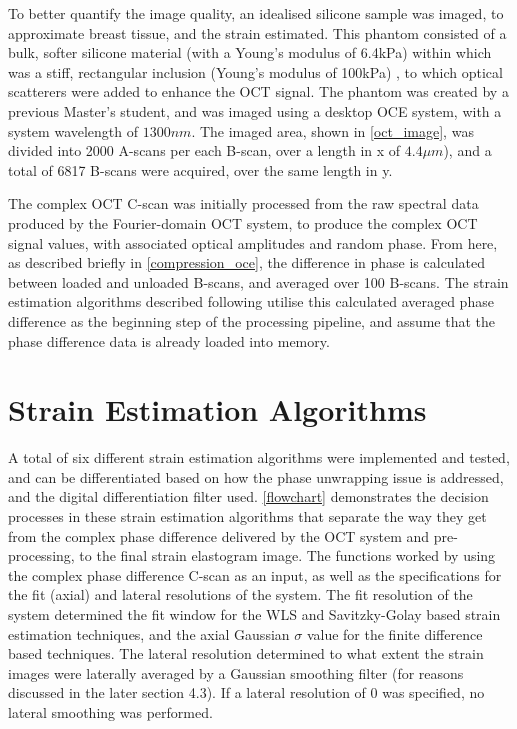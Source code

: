 To better quantify the image quality, an idealised silicone sample was imaged, to approximate breast tissue, and the strain estimated. This phantom consisted of a bulk, softer silicone material (with a Young's modulus of 6.4kPa) within which was a stiff, rectangular inclusion (Young's modulus of 100kPa) \cite{hepburn_improving_2017}, to which optical scatterers were added to enhance the OCT signal. The phantom was created by a previous Master's student, and was imaged using a desktop OCE system, with a system wavelength of $1300nm$. The imaged area, shown in \autoref{oct_image}, was divided into 2000 A-scans per each B-scan, over a length in x of $4.4\mu m$), and a total of 6817 B-scans were acquired, over the same length in y.

The complex OCT C-scan was initially processed from the raw spectral data produced by the Fourier-domain OCT system, to produce the complex OCT signal values, with associated optical amplitudes and random phase. From here, as described briefly in \autoref{compression_oce}, the difference in phase is calculated between loaded and unloaded B-scans, and averaged over 100 B-scans. The strain estimation algorithms described following utilise this calculated averaged phase difference as the beginning step of the processing pipeline, and assume that the phase difference data is already loaded into memory.

\section{Strain Estimation Algorithms}\label{algorithms}

A total of six different strain estimation algorithms were implemented and tested, and can be differentiated based on how the phase unwrapping issue is addressed, and the digital differentiation filter used. \autoref{flowchart} demonstrates the decision processes in these strain estimation algorithms that separate the way they get from the complex phase difference delivered by the OCT system and pre-processing, to the final strain elastogram image.
The functions worked by using the complex phase difference C-scan as an input, as well as the specifications for the fit (axial) and lateral resolutions of the system. The fit resolution of the system determined the fit window for the WLS and Savitzky-Golay based strain estimation techniques, and the axial Gaussian $\sigma$ value for the finite difference based techniques. The lateral resolution determined to what extent the strain images were laterally averaged by a Gaussian smoothing filter (for reasons discussed in the later section 4.3). If a lateral resolution of 0 was specified, no lateral smoothing was performed. 

